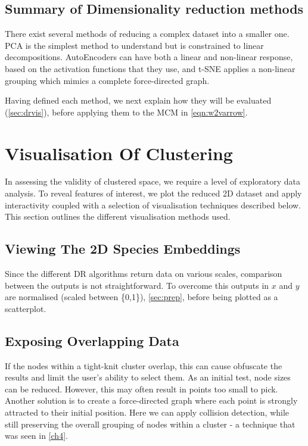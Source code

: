 \subsection{Summary of Dimensionality reduction methods}
There exist several methods of reducing a complex dataset into a smaller one. PCA is the simplest method to understand but is constrained to linear decompositions. AutoEncoders can have both a linear and non-linear response, based on the activation functions that they use, and t-SNE applies a non-linear grouping which mimics a complete force-directed graph.

Having defined each method, we next explain how they will be evaluated (\autoref{sec:drvis}), before applying them to the MCM in \autoref{eqn:w2varrow}.




\section{Visualisation Of Clustering}\label{sec:drvis}

In assessing the validity of clustered space, we require a level of exploratory data analysis. To reveal features of interest, we plot the reduced 2D dataset and apply interactivity coupled with a selection of visualisation techniques described below. This section outlines the different visualisation methods used.

\subsection{Viewing The 2D Species Embeddings}
Since the different DR algorithms return data on various scales, comparison between the outputs is not straightforward. To overcome this outputs in $x$ and $y$ are normalised (scaled between \{0,1\}), \autoref{sec:prep}, before being plotted as a scatterplot.


\subsection{Exposing Overlapping Data}
If the nodes within a tight-knit cluster overlap, this can cause obfuscate the results and limit the user's ability to select them. As an initial test, node sizes can be reduced. However, this may often result in points too small to pick. Another solution is to create a force-directed graph where each point is strongly attracted to their initial position. Here we can apply collision detection, while still preserving the overall grouping of nodes within a cluster - a technique that was seen in \autoref{ch4}.


